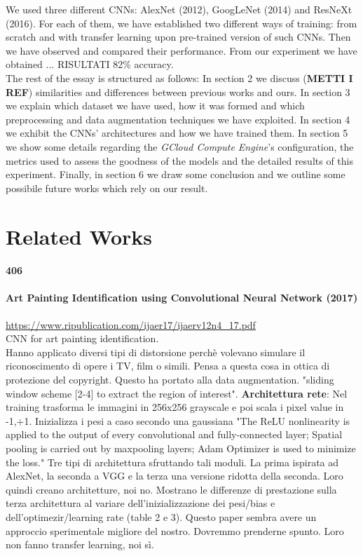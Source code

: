 \documentclass{article}
\begin{document}
We used three different CNNs: AlexNet (2012), GoogLeNet (2014) and ResNeXt (2016). For each of them, we have established two different ways of training: from scratch and with transfer learning  upon pre-trained version of such CNNs. Then we have observed and compared their performance. From our experiment we have obtained ... RISULTATI 82\% accuracy.\\

The rest of the essay is structured as follows: In section 2 we discuss (\textbf{METTI I REF}) similarities and differences between previous works and ours. In section 3 we explain which dataset we have used, how it was formed and which preprocessing and data augmentation techniques we have exploited. In section 4 we exhibit the CNNs' architectures and how we have trained them. In section 5 we show some details regarding the \textit{GCloud Compute Engine}'s configuration, the metrics used to assess the goodness of the models and the detailed results of this experiment. Finally, in section 6 we draw some conclusion and we outline some possibile future works which rely on our result.


\section{Related Works}

\paragraph{406}

\paragraph{Art Painting Identification using Convolutional Neural Network (2017)}
\url{https://www.ripublication.com/ijaer17/ijaerv12n4_17.pdf}\\
CNN for art painting identification.\\ Hanno applicato diversi tipi di distorsione perchè volevano simulare il riconoscimento di opere i TV, film o simili. Pensa a questa cosa in ottica di protezione del copyright. Questo ha portato alla data augmentation. "sliding window scheme [2-4] to extract the region of interest".
\textbf{Architettura rete}: Nel training trasforma le immagini in 256x256 grayscale e poi scala i pixel value in -1,+1.  Inizializza i pesi a caso secondo una gaussiana "The ReLU nonlinearity is applied to the output of every convolutional and
fully-connected layer; Spatial pooling is carried out by maxpooling layers; Adam Optimizer is used to minimize the loss." Tre tipi di architettura sfruttando tali moduli. La prima ispirata ad AlexNet, la seconda a VGG e la terza una versione ridotta della seconda. Loro quindi creano architetture, noi no.
Mostrano le differenze di prestazione sulla terza architettura al variare dell'inizializzazione dei pesi/bias e dell'optimezir/learning rate (table 2 e 3). Questo paper sembra avere un approccio sperimentale migliore del nostro. Dovremmo prenderne spunto. Loro non fanno transfer learning, noi sì.
\end{document}

